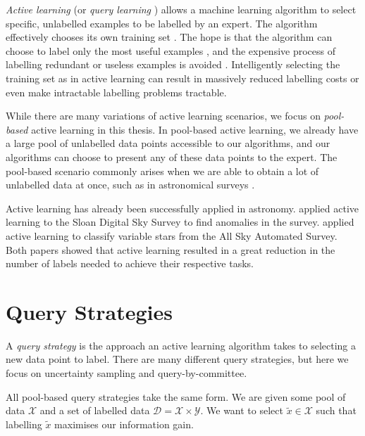     \emph{Active learning} (or \emph{query learning} \citep{settles09, seung92,angluin86})
    allows a machine learning algorithm to select specific, unlabelled examples
    to be labelled by an expert. The algorithm effectively chooses its own
    training set \citep{settles09}. The hope is that the algorithm can choose to
    label only the most useful examples \citep{mccallum98}, and the expensive
    process of labelling redundant or useless examples is avoided
    \citep{engelson99}. Intelligently selecting the training set as in active
    learning can result in massively reduced labelling costs \citep{lewis94,
    king04} or even make intractable labelling problems tractable.

    While there are many variations of active learning scenarios, we focus on
    \emph{pool-based} active learning in this thesis. In pool-based active
    learning, we already have a large pool of unlabelled data points accessible
    to our algorithms, and our algorithms can choose to present any of these
    data points to the expert. The pool-based scenario commonly arises when we
    are able to obtain a lot of unlabelled data at once, such as in astronomical
    surveys \citep{pelleg04, richards12, marshall15}.

    Active learning has already been successfully applied in astronomy.
    \citet{pelleg04} applied active learning to the Sloan Digital Sky Survey to
    find anomalies in the survey. \citet{richards12} applied active learning to
    classify variable stars from the All Sky Automated Survey. Both papers
    showed that active learning resulted in a great reduction in the number of
    labels needed to achieve their respective tasks.

\section{Query Strategies}
\label{sec:query-strategies}

    A \emph{query strategy} is the approach an active learning algorithm takes
    to selecting a new data point to label. There are many different query
    strategies, but here we focus on uncertainty sampling and
    query-by-committee.

    All pool-based query strategies take the same form. We are given some pool
    of data $\mathcal X$ and a set of labelled data $\mathcal D = \mathcal X
    \times \mathcal Y$. We want to select $\tilde x \in \mathcal X$ such that
    labelling $\tilde x$ maximises our information gain.

